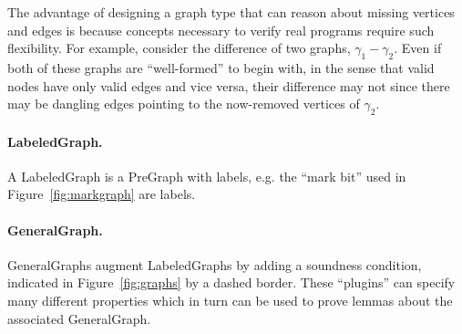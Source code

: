 The advantage of designing a graph type that can reason about missing vertices and edges is because concepts necessary to verify real programs require such flexibility.  For example, consider the difference of two graphs, $\gamma_1 - \gamma_2$.  Even if both of these graphs are ``well-formed'' to begin with, in the sense that valid nodes have only valid edges and vice versa, their difference may not since there may be dangling edges pointing to the now-removed vertices of $\gamma_2$.
\fi


\vspace{-0.75ex}
\iftrue
\paragraph{LabeledGraph.}
A LabeledGraph is a PreGraph with labels, e.g. the ``mark bit'' used in Figure~\ref{fig:markgraph} are labels.
\fi
\iffalse
\paragraph{LabeledGraph.}
Although many basic lemmas can be proved about PreGraphs, they are inadequate for real program verification.
When reasoning about the concrete graphs manipulated by various algorithms,
we usually need to add a notion of \emph{labels} on vertices and/or edges, such as
the ``mark bit'' used in Figure~\ref{fig:markgraph}, letting us define notions like ``the vertices reachable via an unmarked path''
on LabeledGraphs.
\fi

\vspace{-0.75ex}
\paragraph{GeneralGraph.}
GeneralGraphs augment LabeledGraphs by adding a soundness condition, indicated in Figure~\ref{fig:graphs} by a dashed border.  These ``plugins'' can specify many different properties which in turn can be used to prove lemmas about the associated GeneralGraph.

